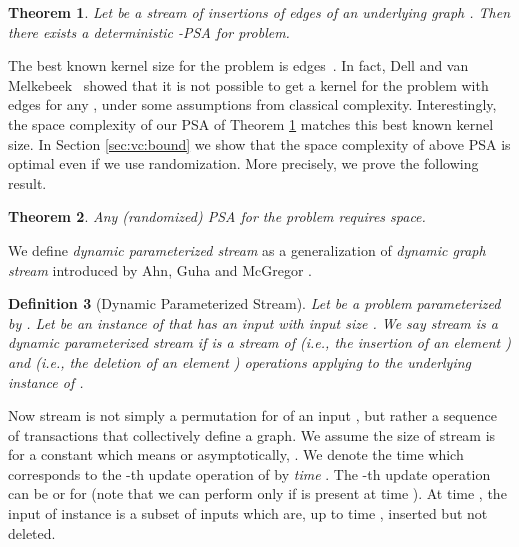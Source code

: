 \documentclass[11pt,letter]{article}
\newtheorem{theorem}{Theorem}
\newtheorem{definition}[theorem]{Definition}
\renewcommand{\paragraph}[1]{\medskip \noindent {\bf #1}}
\begin{document}
\begin{theorem}
\label{THM:VC:INSERTION}
Let  be a stream of  insertions of edges of an underlying graph .
Then there exists a \emph{deterministic} -PSA for  problem.
\end{theorem}



The best known kernel size for the  problem is  edges~\cite{BG93}.
In fact, Dell and van Melkebeek~\cite{dell-lower-bound} showed that it is not possible to get
a kernel for the  problem with  edges for any ,
under some assumptions from classical complexity.
Interestingly, the space complexity of our PSA of Theorem \ref{THM:VC:INSERTION} matches
this best known kernel size.
In Section \ref{sec:vc:bound} we show that the space complexity of above PSA
is optimal even if we use randomization.
More precisely, we prove the following result.

\begin{theorem}
\label{thm:vc:lower:bound}
Any (randomized) PSA for the  problem requires  space.
\label{thm:lower-bound-vc}
\end{theorem}








\paragraph{Dynamic Streaming.}
We define \textit{dynamic parameterized stream} as a generalization of \textit{dynamic graph stream}
introduced by Ahn, Guha and McGregor \cite{AGM12a}.



\begin{definition}[Dynamic Parameterized Stream]
Let   be a problem parameterized by . Let  be an instance of 
that has an input  with input size .
We say stream  is a dynamic parameterized stream if 
is  a stream of  (i.e., the insertion
of an element ) and  (i.e., the deletion of
an element ) operations applying to the underlying instance
 of .
\end{definition}



Now stream  is not simply a permutation
 for  of an input
, but rather a sequence of transactions that collectively define a
graph. We assume the size of stream 
is  for a constant  which means  
or asymptotically, . We denote the time which corresponds to
the -th update operation of  by \textit{time} . The -th update operation
can be  or  for 
(note that we can perform  only if  is
present at time ). At time ,
the input of instance  is a subset  of inputs
which are, up to time , inserted but not deleted.
\end{document}
